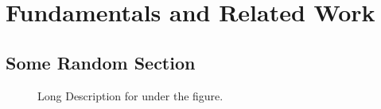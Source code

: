 
\chapter{Fundamentals and Related Work}
\label{sec:fundamentals_related-work}
\section{Some Random Section}
\blindtext
\Blindtext

\begin{figure}[!htbp]
    \centering
    \hspace{10pt}
    \caption[Short Description for List of Figures]{Long Description for under the figure.}
    \label{fig:logo1and2}
\end{figure}
